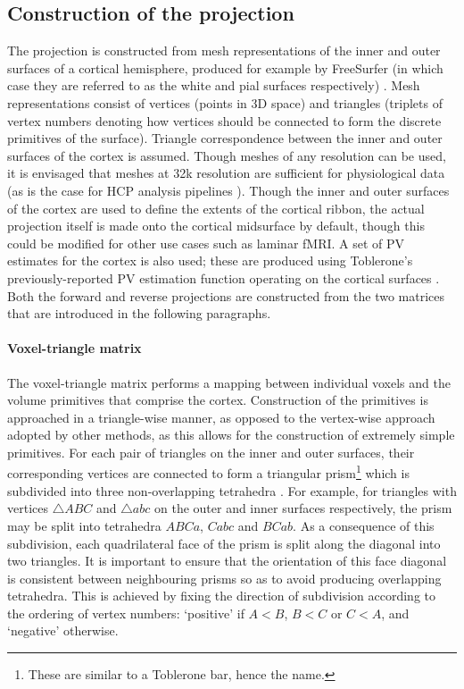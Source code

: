 \documentclass[review]{elsarticle}
\begin{document}
\subsection{Construction of the projection}

The projection is constructed from mesh representations of the inner and outer surfaces of a cortical hemisphere, produced for example by FreeSurfer (in which case they are referred to as the white and pial surfaces respectively) \cite{Fischl2012}. Mesh representations consist of vertices (points in 3D space) and triangles (triplets of vertex numbers denoting how vertices should be connected to form the discrete primitives of the surface). Triangle correspondence between the inner and outer surfaces of the cortex is assumed. Though meshes of any resolution can be used, it is envisaged that meshes at 32k resolution are sufficient for physiological data (as is the case for HCP analysis pipelines \cite{Glasser2013}). Though the inner and outer surfaces of the cortex are used to define the extents of the cortical ribbon, the actual projection itself is made onto the cortical midsurface by default, though this could be modified for other use cases such as laminar fMRI. A set of PV estimates for the cortex is also used; these are produced using Toblerone's previously-reported PV estimation function operating on the cortical surfaces \cite{tob_paper}. Both the forward and reverse projections are constructed from the two matrices that are introduced in the following paragraphs. 

\paragraph{Voxel-triangle matrix}
The voxel-triangle matrix performs a mapping between individual voxels and the volume primitives that comprise the cortex. Construction of the primitives is approached in a triangle-wise manner, as opposed to the vertex-wise approach adopted by other methods, as this allows for the construction of extremely simple primitives. For each pair of triangles on the inner and outer surfaces, their corresponding vertices are connected to form a triangular prism\footnote{These are similar to a Toblerone bar, hence the name.} which is subdivided into three non-overlapping tetrahedra \cite{Dompierre1999}. For example, for triangles with vertices $\triangle ABC$ and $\triangle abc$ on the outer and inner surfaces respectively, the prism may be split into tetrahedra $ABCa$, $Cabc$ and $BCab$. As a consequence of this subdivision, each quadrilateral face of the prism is split along the diagonal into two triangles. It is important to ensure that the orientation of this face diagonal is consistent between neighbouring prisms so as to avoid producing overlapping tetrahedra. This is achieved by fixing the direction of subdivision according to the ordering of vertex numbers: `positive' if $A < B$, $B < C$ or $C < A$, and `negative' otherwise. 
\end{document}
